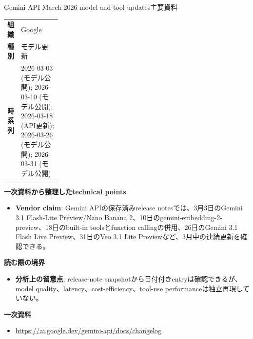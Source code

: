 \begin{technicalnote}{Gemini API March 2026 model and tool updates}{主要資料}
\begingroup
\begin{tabularx}{\linewidth}{@{}>{\bfseries}p{0.22\linewidth}X@{}}
組織 & Google \\
種別 & モデル更新 \\
時系列 & 2026-03-03 (モデル公開); 2026-03-10 (モデル公開); 2026-03-18 (API更新); 2026-03-26 (モデル公開); 2026-03-31 (モデル公開) \\
\end{tabularx}
\smallskip
{\bfseries 一次資料から整理したtechnical points}
\begin{itemize}[leftmargin=1.5em,itemsep=0.35em]
\item \textbf{Vendor claim}: Gemini APIの保存済みrelease notesでは、3月3日のGemini 3.1 Flash-Lite Preview/Nano Banana 2、10日のgemini-embedding-2-preview、18日のbuilt-in toolsとfunction callingの併用、26日のGemini 3.1 Flash Live Preview、31日のVeo 3.1 Lite Previewなど、3月中の連続更新を確認できる。
\end{itemize}
\begin{minipage}{\linewidth}
{\bfseries 読む際の境界}
\begin{itemize}[leftmargin=1.5em,itemsep=0.35em]
\item \textbf{分析上の留意点}: release-note snapshotから日付付きentryは確認できるが、model quality、latency、cost-efficiency、tool-use performanceは独立再現していない。
\end{itemize}
\begin{samepage}
{\bfseries 一次資料}
\begingroup\sloppy
\begin{itemize}[leftmargin=1.5em,itemsep=0.25em]
\item {\scriptsize\url{https://ai.google.dev/gemini-api/docs/changelog}}
\end{itemize}
\endgroup
\end{samepage}
\end{minipage}
\endgroup
\end{technicalnote}
\medskip

